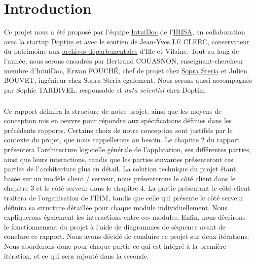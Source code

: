 \chapter{Introduction}
\pagestyle{fancy}
\fancyhf{}

Ce projet nous a été proposé par l’équipe \href{https://www-intuidoc.irisa.fr/}{IntuiDoc} de l’\href{https://www.irisa.fr/}{IRISA}, en collaboration avec la startup \href{http://www.doptim.eu}{Doptim} et avec le soutien de Jean-Yves LE CLERC, conservateur du patrimoine aux \href{http://archives.ille-et-vilaine.fr/fr}{archives départementales} d'Ille-et-Vilaine. Tout au long de l’année, nous serons encadrés par Bertrand COÜASNON, enseignant-chercheur membre d'IntuiDoc, Erwan FOUCHÉ, chef de projet chez \href{https://www.soprasteria.com/fr}{Sopra Steria} et Julien BOUVET, ingénieur chez Sopra Steria également. Nous serons aussi accompagnés par Sophie TARDIVEL, responsable et \textit{data scientist} chez Doptim.

\paragraph{}
Ce rapport définira la structure de notre projet, ainsi que les moyens de conception mis en oeuvre pour répondre aux spécifications définies dans les précédents rapports. Certains choix de notre conception sont justifiés par le contexte du projet, que nous rappellerons au besoin. Le chapitre 2 du rapport présentera l'architecture logicielle générale de l'application, ses différentes parties, ainsi que leurs interactions, tandis que les parties suivantes présenteront ces parties de l'architecture plus en détail. La solution technique du projet étant basée sur un modèle client / serveur, nous présenterons le côté client dans le chapitre 3 et le côté serveur dans le chapitre 4. La partie présentant le côté client traitera de l'organisation de l'IHM, tandis que celle qui présente le côté serveur définira sa structure détaillée pour chaque module individuellement. Nous expliquerons également les interactions entre ces modules. Enfin, nous décrirons le fonctionnement du projet à l'aide de diagrammes de séquence avant de conclure ce rapport. Nous avons décidé de conduire ce projet sur deux itérations. Nous aborderons donc pour chaque partie ce qui est intégré à la première itération, et ce qui sera rajouté dans la seconde.